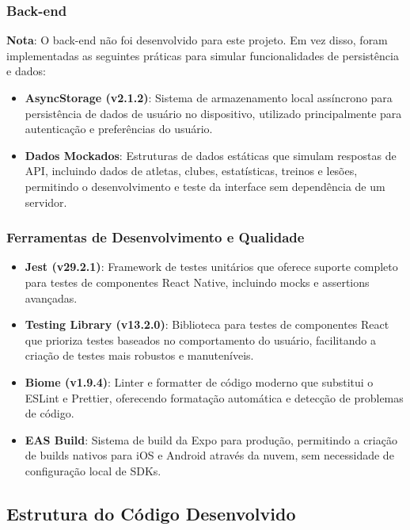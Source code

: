 \subsubsection{Back-end}
\textbf{Nota}: O back-end não foi desenvolvido para este projeto. Em vez disso, foram implementadas as seguintes práticas para simular funcionalidades de persistência e dados:

\begin{itemize}
    \item \textbf{AsyncStorage (v2.1.2)}: Sistema de armazenamento local assíncrono para persistência de dados de usuário no dispositivo, utilizado principalmente para autenticação e preferências do usuário.
    
    \item \textbf{Dados Mockados}: Estruturas de dados estáticas que simulam respostas de API, incluindo dados de atletas, clubes, estatísticas, treinos e lesões, permitindo o desenvolvimento e teste da interface sem dependência de um servidor.
\end{itemize}

\subsubsection{Ferramentas de Desenvolvimento e Qualidade}
\begin{itemize}
    \item \textbf{Jest (v29.2.1)}: Framework de testes unitários que oferece suporte completo para testes de componentes React Native, incluindo mocks e assertions avançadas.
    
    \item \textbf{Testing Library (v13.2.0)}: Biblioteca para testes de componentes React que prioriza testes baseados no comportamento do usuário, facilitando a criação de testes mais robustos e manuteníveis.
    
    \item \textbf{Biome (v1.9.4)}: Linter e formatter de código moderno que substitui o ESLint e Prettier, oferecendo formatação automática e detecção de problemas de código.
    
    \item \textbf{EAS Build}: Sistema de build da Expo para produção, permitindo a criação de builds nativos para iOS e Android através da nuvem, sem necessidade de configuração local de SDKs.
\end{itemize}

\subsection{Estrutura do Código Desenvolvido}

